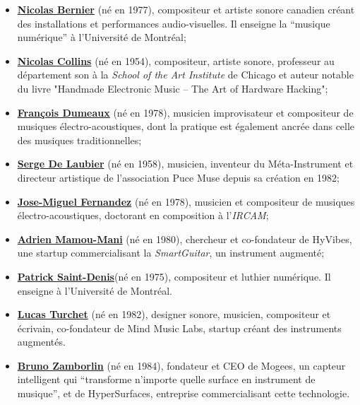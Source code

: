 \vspace{-1em}
\begin{itemize}[noitemsep]
\item \textbf{\hyperref[appendix:bernier]{Nicolas Bernier}} (né en 1977), compositeur et artiste sonore canadien créant des installations et performances audio-visuelles. Il enseigne la ``musique numérique'' à l'Université de Montréal;
\item \textbf{\hyperref[appendix:collins]{Nicolas Collins}} (né en 1954), compositeur, artiste sonore, professeur au département son à la \textit{School of the Art Institute} de Chicago et auteur notable du livre "Handmade Electronic Music – The Art of Hardware Hacking";
\item \textbf{\hyperref[appendix:dumeaux]{François Dumeaux}} (né en 1978), musicien improvisateur  et compositeur de musiques électro-acoustiques, dont la pratique est également ancrée dans celle des musiques traditionnelles;
\item \textbf{\hyperref[appendix:delaubier]{Serge De Laubier}} (né en 1958), musicien, inventeur du Méta-Instrument et directeur artistique de l'association Puce Muse depuis sa création en 1982;
\item \textbf{\hyperref[appendix:fernandez]{Jose-Miguel Fernandez}} (né en 1978), musicien et compositeur de musiques électro-acoustiques, doctorant en composition à l'\textit{IRCAM};
\item \textbf{\hyperref[appendix:mamou-mani]{Adrien Mamou-Mani}} (né en 1980), chercheur et co-fondateur de HyVibes, une startup commercialisant la \textit{SmartGuitar}, un instrument augmenté;
\item \textbf{\hyperref[appendix:saint-denis]{Patrick Saint-Denis}}(né en 1975), compositeur et luthier numérique. Il enseigne à l'Université de Montréal.
\item \textbf{\hyperref[appendix:turchet]{Lucas Turchet}} (né en 1982), designer sonore, musicien, compositeur et écrivain, co-fondateur de Mind Music Labs, startup créant des instruments augmentés.
\item \textbf{\hyperref[appendix:zamborlin]{Bruno Zamborlin}} (né en 1984), fondateur et CEO de Mogees, un capteur intelligent qui ``transforme n'importe quelle surface en instrument de musique'', et de HyperSurfaces, entreprise commercialisant cette technologie. 
\end{itemize}


